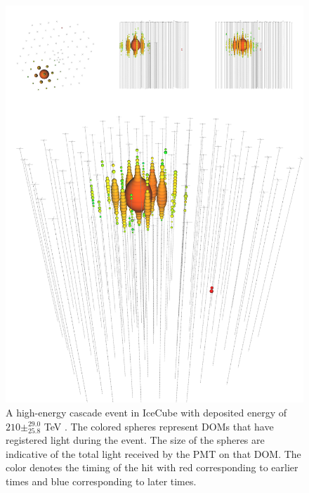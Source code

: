 \documentclass{gatech-thesis}
\begin{document}
\begin{figure}[ht]
  \begin{center}
    \includegraphics[width=1.0\textwidth,keepaspectratio]{hese_cascade_event.png}
  \end{center}
  \caption[Sample Cascade Event]{A high-energy cascade event in IceCube with deposited energy of $210\pm^{29.0}_{25.8}$ TeV \cite{2013Sci...342E...1I}. The colored spheres represent DOMs that have registered light during the event. The size of the spheres are indicative of the total light received by the PMT on that DOM. The color denotes the timing of the hit with red corresponding to earlier times and blue corresponding to later times.}
  \label{fig:cascade}
\end{figure}
\end{document}
